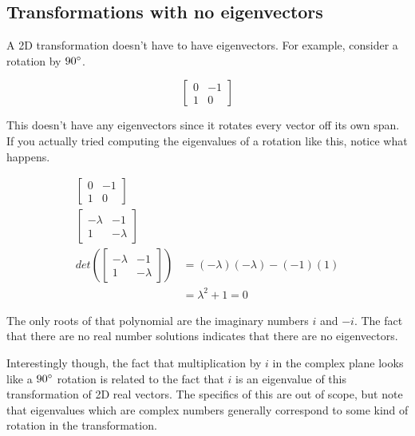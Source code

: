 \subsection{Transformations with no eigenvectors}

A 2D transformation doesn't have to have eigenvectors. For example, consider a
rotation by $90 \degree$.

\begin{equation*}
  \begin{bmatrix}
    0 & -1 \\
    1 & 0
  \end{bmatrix}
\end{equation*}

This doesn't have any eigenvectors since it rotates every vector off its own
span. If you actually tried computing the eigenvalues of a rotation like this,
notice what happens.

\begin{align*}
  \begin{bmatrix}
    0 & -1 \\
    1 & 0
  \end{bmatrix} & \\
  \begin{bmatrix}
    - \lambda & -1 \\
    1 & -\lambda
  \end{bmatrix} & \\
  det\left(\begin{bmatrix}
    -\lambda & -1 \\
    1 & -\lambda
  \end{bmatrix}\right) &=
  (-\lambda)(-\lambda) - (-1)(1) \\
  &= \lambda^2 + 1 = 0
\end{align*}

The only roots of that polynomial are the imaginary numbers $i$ and $-i$. The
fact that there are no real number solutions indicates that there are no
eigenvectors.

\begin{remark}
  Interestingly though, the fact that multiplication by $i$ in the complex plane
  looks like a $90 \degree$ rotation is related to the fact that $i$ is an
  eigenvalue of this transformation of 2D real vectors. The specifics of this
  are out of scope, but note that eigenvalues which are complex numbers
  generally correspond to some kind of rotation in the transformation.
\end{remark}

